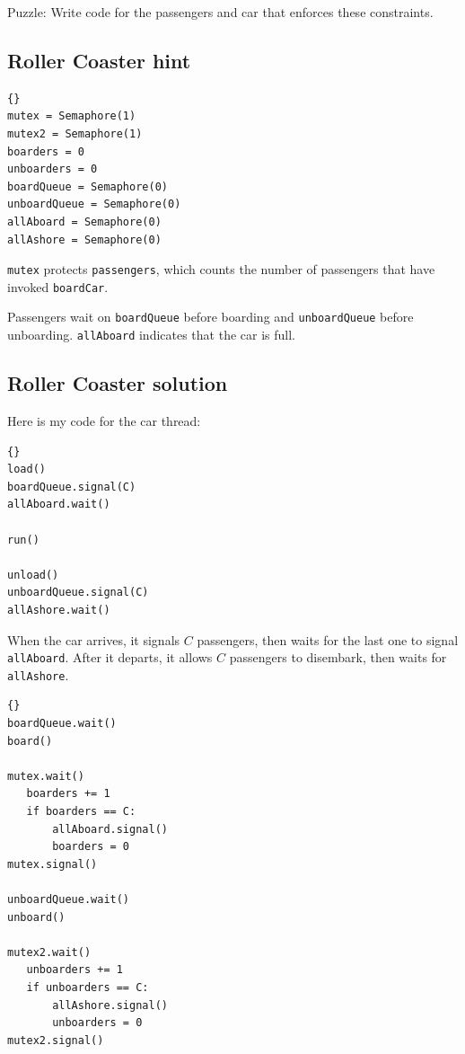 \documentclass{book}
\newcommand{\clearemptydoublepage}{\newpage\cleardoublepage}
\begin{document}
Puzzle: Write code for the passengers and car that enforces these
constraints.


\clearemptydoublepage
\subsection{Roller Coaster hint}

\begin{latin}
\begin{latin}
\begin{lstlisting}[title={Roller Coaster hint}]{}
mutex = Semaphore(1)
mutex2 = Semaphore(1)
boarders = 0
unboarders = 0
boardQueue = Semaphore(0)
unboardQueue = Semaphore(0)
allAboard = Semaphore(0)
allAshore = Semaphore(0)
\end{lstlisting}
\end{latin}
\end{latin}

{\tt mutex} protects {\tt passengers}, which counts the number of
passengers that have invoked {\tt boardCar}.  

Passengers wait on {\tt boardQueue} before boarding and
{\tt unboardQueue} before unboarding.  {\tt allAboard}
indicates that the car is full.


\clearemptydoublepage
\subsection{Roller Coaster solution}

Here is my code for the car thread:

\begin{latin}
\begin{latin}
\begin{lstlisting}[title={Roller Coaster solution (car)}]{}
load()
boardQueue.signal(C)
allAboard.wait()

run()

unload()
unboardQueue.signal(C)
allAshore.wait()
\end{lstlisting}
\end{latin}
\end{latin}

When the car arrives, it signals $C$ passengers,
then waits for the last one to signal {\tt allAboard}.
After it departs, it allows $C$ passengers to disembark,
then waits for {\tt allAshore}.

\begin{latin}
\begin{latin}
\begin{lstlisting}[title={Roller Coaster solution (passenger)}]{}
boardQueue.wait()
board()

mutex.wait()
   boarders += 1
   if boarders == C:
       allAboard.signal()
       boarders = 0
mutex.signal()

unboardQueue.wait()
unboard()

mutex2.wait()
   unboarders += 1
   if unboarders == C:
       allAshore.signal()
       unboarders = 0
mutex2.signal()
\end{lstlisting}
\end{latin}
\end{latin}
\end{document}
